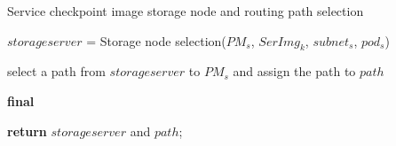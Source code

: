 \documentclass[8pt,twocolumn]{ctexart}
\begin{document}
 
    \begin{algorithm}
        
        \caption{Service checkpoint image storage node and routing path selection}
        
        \LinesNumbered
        
        
        
        $storageserver$ = Storage node selection($PM_s$, $SerImg_k$, $subnet_s$, $pod_s$)\;
        
        
        {
             select a path from $storageserver$ to $PM_s$ and assign the path to $path$\;
        }
        
        \textbf{final} \;
        
        \textbf{return} $storageserver$ and $path$;
        
    \end{algorithm}
 
\end{document}
